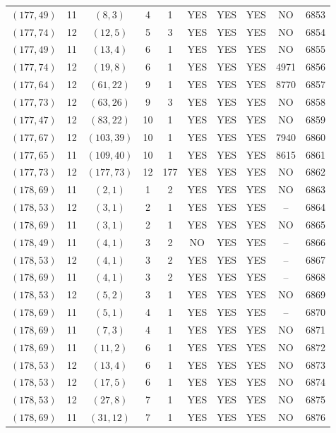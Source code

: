 \begin{longtable}{|c|c|c|c|c|c|c|c|c|c|}
$(177, 49)$ & 11 & $(8, 3)$ & 4 & 1 & YES & YES & YES & NO & 6853\\
$(177, 74)$ & 12 & $(12, 5)$ & 5 & 3 & YES & YES & YES & NO & 6854\\
$(177, 49)$ & 11 & $(13, 4)$ & 6 & 1 & YES & YES & YES & NO & 6855\\
$(177, 74)$ & 12 & $(19, 8)$ & 6 & 1 & YES & YES & YES & 4971 & 6856\\
$(177, 64)$ & 12 & $(61, 22)$ & 9 & 1 & YES & YES & YES & 8770 & 6857\\
$(177, 73)$ & 12 & $(63, 26)$ & 9 & 3 & YES & YES & YES & NO & 6858\\
$(177, 47)$ & 12 & $(83, 22)$ & 10 & 1 & YES & YES & YES & NO & 6859\\
$(177, 67)$ & 12 & $(103, 39)$ & 10 & 1 & YES & YES & YES & 7940 & 6860\\
$(177, 65)$ & 11 & $(109, 40)$ & 10 & 1 & YES & YES & YES & 8615 & 6861\\
$(177, 73)$ & 12 & $(177, 73)$ & 12 & 177 & YES & YES & YES & NO & 6862\\
$(178, 69)$ & 11 & $(2, 1)$ & 1 & 2 & YES & YES & YES & NO & 6863\\
$(178, 53)$ & 12 & $(3, 1)$ & 2 & 1 & YES & YES & YES & -- & 6864\\
$(178, 69)$ & 11 & $(3, 1)$ & 2 & 1 & YES & YES & YES & NO & 6865\\
$(178, 49)$ & 11 & $(4, 1)$ & 3 & 2 & NO & YES & YES & -- & 6866\\
$(178, 53)$ & 12 & $(4, 1)$ & 3 & 2 & YES & YES & YES & -- & 6867\\
$(178, 69)$ & 11 & $(4, 1)$ & 3 & 2 & YES & YES & YES & -- & 6868\\
$(178, 53)$ & 12 & $(5, 2)$ & 3 & 1 & YES & YES & YES & NO & 6869\\
$(178, 69)$ & 11 & $(5, 1)$ & 4 & 1 & YES & YES & YES & -- & 6870\\
$(178, 69)$ & 11 & $(7, 3)$ & 4 & 1 & YES & YES & YES & NO & 6871\\
$(178, 69)$ & 11 & $(11, 2)$ & 6 & 1 & YES & YES & YES & NO & 6872\\
$(178, 53)$ & 12 & $(13, 4)$ & 6 & 1 & YES & YES & YES & NO & 6873\\
$(178, 53)$ & 12 & $(17, 5)$ & 6 & 1 & YES & YES & YES & NO & 6874\\
$(178, 53)$ & 12 & $(27, 8)$ & 7 & 1 & YES & YES & YES & NO & 6875\\
$(178, 69)$ & 11 & $(31, 12)$ & 7 & 1 & YES & YES & YES & NO & 6876\\

\end{longtable}
